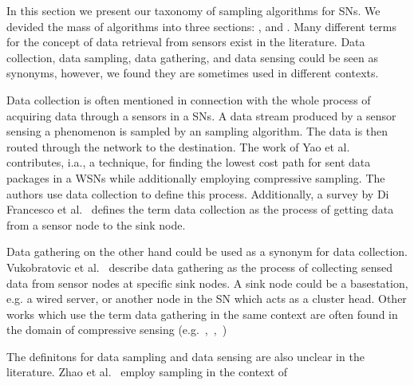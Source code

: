 In this section we present our taxonomy of sampling algorithms for \acp{SN}. We
devided the mass of algorithms into three sections: \catI, \catII  and \catIII.
Many different terms for the concept of data retrieval from sensors exist in
the literature. Data collection, data sampling, data gathering, and data
sensing could be seen as synonyms, however, we found they are sometimes used in
different contexts.
\par
Data collection is often mentioned in connection with the whole process of
acquiring data through a sensors in a \acp{SN}.
A data stream produced by a sensor sensing a phenomenon is sampled by an
sampling algorithm. The data is then routed through the network to the
destination. The work of Yao et al.~\cite{yao2015edal} contributes, i.a., a
technique, for finding the lowest cost path for sent data packages in a
\acp{WSN} while additionally employing compressive sampling. The authors use
data collection to define this process. Additionally, a survey by Di Francesco
et al.~\cite{di2011data} defines the term data collection as the process of
getting data from a sensor node to the sink node.
\par
Data gathering on the other hand could be used as a synonym for data
collection. Vukobratovic et al.~\cite{vukobratovic2010rateless} describe data
gathering as the process of collecting sensed data from sensor nodes at
specific sink nodes. A sink node could be a basestation, e.g. a wired server,
or another node in the \ac{SN} which acts as a cluster head. Other works which
use the term data gathering in the same context are often found in the domain
of compressive sensing
(e.g.~\cite{cheng2013stcdg},~\cite{luo2009compressive},~\cite{wang2012data})
\par
The definitons for data sampling and data sensing are also unclear in the
literature. Zhao et al.~\cite{zhao2016cats} employ sampling in the context of
